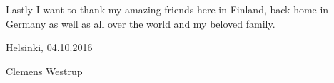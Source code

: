 Lastly I want to thank my amazing friends here in Finland, back home in Germany as well as all over the world and my beloved family.


\vspace{5cm}
Helsinki, 04.10.2016

\vspace{5mm}
{\hfill Clemens Westrup \hspace{1cm}}

\newpage

{\hypersetup{linkcolor=black}
\thesistableofcontents
}
%
%
%
%
%



\cleardoublepage
\storeinipagenumber
{}
\setcounter{page}{1}
